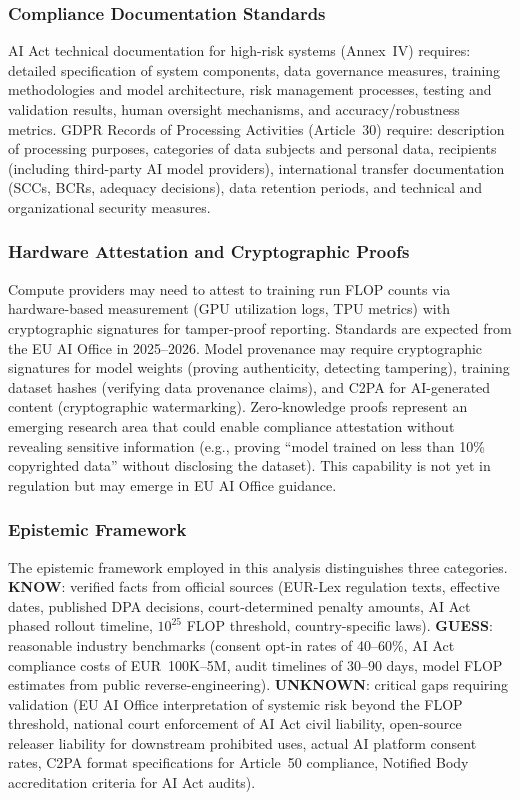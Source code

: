 \documentclass[11pt,a4paper]{article}
\begin{document}
\subsubsection{Compliance Documentation Standards}

AI Act technical documentation for high-risk systems (Annex~IV) requires: detailed specification of system components, data governance measures, training methodologies and model architecture, risk management processes, testing and validation results, human oversight mechanisms, and accuracy/robustness metrics. GDPR Records of Processing Activities (Article~30) require: description of processing purposes, categories of data subjects and personal data, recipients (including third-party AI model providers), international transfer documentation (SCCs, BCRs, adequacy decisions), data retention periods, and technical and organizational security measures.

\subsubsection{Hardware Attestation and Cryptographic Proofs}

Compute providers may need to attest to training run FLOP counts via hardware-based measurement (GPU utilization logs, TPU metrics) with cryptographic signatures for tamper-proof reporting. Standards are expected from the EU AI Office in 2025--2026. Model provenance may require cryptographic signatures for model weights (proving authenticity, detecting tampering), training dataset hashes (verifying data provenance claims), and C2PA for AI-generated content (cryptographic watermarking). Zero-knowledge proofs represent an emerging research area that could enable compliance attestation without revealing sensitive information (e.g., proving ``model trained on less than 10\% copyrighted data'' without disclosing the dataset). This capability is not yet in regulation but may emerge in EU AI Office guidance.

\subsubsection{Epistemic Framework}

The epistemic framework employed in this analysis distinguishes three categories. \textbf{KNOW}: verified facts from official sources (EUR-Lex regulation texts, effective dates, published DPA decisions, court-determined penalty amounts, AI Act phased rollout timeline, $10^{25}$ FLOP threshold, country-specific laws). \textbf{GUESS}: reasonable industry benchmarks (consent opt-in rates of 40--60\%, AI Act compliance costs of EUR~100K--5M, audit timelines of 30--90 days, model FLOP estimates from public reverse-engineering). \textbf{UNKNOWN}: critical gaps requiring validation (EU AI Office interpretation of systemic risk beyond the FLOP threshold, national court enforcement of AI Act civil liability, open-source releaser liability for downstream prohibited uses, actual AI platform consent rates, C2PA format specifications for Article~50 compliance, Notified Body accreditation criteria for AI Act audits).
\end{document}
